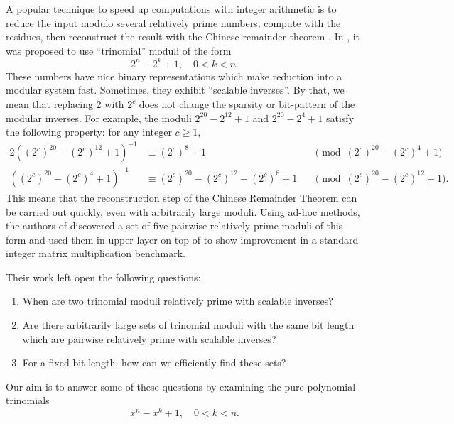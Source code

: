 \documentclass[]{article}
\theoremstyle{definition}
\begin{document}
A popular technique to speed up computations with integer arithmetic is to
reduce the input modulo several relatively prime numbers, compute with the
residues, then reconstruct the result with the Chinese remainder theorem
\cite{knuth,doliskani_simultaneous_2018,zima_cunningham_2007}. In \cite{zima},
it was proposed to use ``trinomial'' moduli of the form
\begin{equation}
    \label{trinom2}
    2^n - 2^k + 1, \quad 0 < k < n.
\end{equation}
These numbers have nice binary representations which make reduction into a
modular system fast. Sometimes, they exhibit ``scalable inverses''. By that, we
mean that replacing $2$ with $2^c$ does not change the sparsity or bit-pattern
of the modular inverses. For example, the moduli $2^{20} - 2^{12} + 1$ and
$2^{20} - 2^4 + 1$ satisfy the following property: for any integer $c \geq 1$,
\begin{alignat*}{2}
    ((2^c)^{20}-(2^c)^{12}+1)^{-1} &\equiv (2^c)^{8} + 1 &&\pmod{(2^c)^{20}-(2^c)^{4}+1}\\
    ((2^c)^{20}-(2^c)^{4}+1)^{-1} &\equiv (2^c)^{20} - (2^c)^{12} - (2^c)^{8} + 1 &&\pmod{(2^c)^{20}-(2^c)^{12}+1}.
\end{alignat*}
This means that the reconstruction step of the Chinese Remainder Theorem can be
carried out quickly, even with arbitrarily large moduli. Using ad-hoc methods,
the authors of \cite{zima} discovered a set of five pairwise relatively prime
moduli of this form and used them in upper-layer on top of
\cite{doliskani_simultaneous_2018} to show improvement in a standard integer
matrix multiplication benchmark.

Their work left open the following questions:
\begin{enumerate}
    \item When are two trinomial moduli relatively prime with scalable inverses?
    \item Are there arbitrarily large sets of trinomial moduli with the same
    bit length which are pairwise relatively prime with scalable inverses?
    \item For a fixed bit length, how can we efficiently find these sets?
\end{enumerate}
Our aim is to answer some of these questions by examining the pure polynomial
trinomials
\begin{equation}
    \label{trinomx}
    x^n - x^k + 1, \quad 0 < k < n.
\end{equation}
\end{document}

